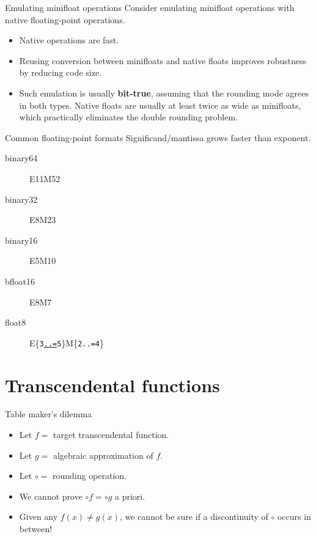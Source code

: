 \documentclass{beamer}
\begin{document}
\begin{frame}{Emulating minifloat operations}
	Consider emulating minifloat operations with native floating-point operations.

	\begin{itemize}
		\item Native operations are fast.
		\item Reusing conversion between minifloats and native floats improves
		      robustness by reducing code size.
		\item Such emulation is usually \textbf{bit-true}, assuming that the
		      rounding mode agrees in both types.  Native floats are usually at
		      least twice as wide as minifloats, which practically eliminates
		      the double rounding problem.
	\end{itemize}
\end{frame}

\begin{frame}{Common floating-point formats}
	Significand/mantissa grows faster than exponent.

	\begin{description}
		\item[binary64] E11M52
		\item[binary32] E8M23
		\item[binary16] E5M10
		\item[bfloat16] E8M7
		\item[float8] E\{\texttt{3\href{https://doc.rust-lang.org/std/ops/struct.RangeInclusive.html}{..=}5}\}M\{\texttt{2..=4}\}
	\end{description}
\end{frame}

\section{Transcendental functions}
\begin{frame}{Table maker's dilemma}
	\begin{itemize}
		\item Let $f =$ target transcendental function.
		\item Let $g =$ algebraic approximation of $f$.
		\item Let $\circ =$ rounding operation.
		\item We cannot prove $\circ f = \circ g$ a priori.
		\item Given any $f \left( x \right) \ne g \left( x \right)$, we cannot
		      be sure if a discontinuity of $\circ$ occurs in between!
	\end{itemize}
\end{frame}
\end{document}
